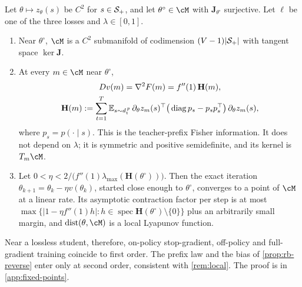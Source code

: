 \begin{proposition}\label{prop:local-conv}
\Ck Let $\theta\mapsto z_\theta(s)$ be $C^2$ for $s\in\mathcal{S}_+$, and let $\theta^\circ\in\cM$ with $\mathbf J_{\theta^\circ}$ surjective. Let $\ell$ be one of the
three losses and $\lambda\in[0,1]$.
\begin{enumerate}[label=(\roman*),nosep]
\item Near $\theta^\circ$, $\cM$ is a $C^2$ submanifold of codimension $(V-1)|\mathcal{S}_+|$ with tangent space $\ker\mathbf J$.
\item At every $m\in\cM$ near $\theta^\circ$,
\begin{gather*}
Dv(m)=\nabla^2F(m)=f''(1)\,\mathbf H(m),\\
\mathbf H(m):=\sum_{t=1}^T\mathbb{E}_{s\sim d^{\,p}_{t}}\,\partial_\theta z_m(s)^\top\big(\operatorname{diag} p_s-p_sp_s^\top\big)\,\partial_\theta z_m(s),
\end{gather*}
where $p_s=p(\cdot\mid s)$. This is the teacher-prefix Fisher information. It does not depend on $\lambda$; it is symmetric and positive
semidefinite, and its kernel is $T_m\cM$.
\item Let $0<\eta<2/\big(f''(1)\lambda_{\max}(\mathbf H(\theta^\circ))\big)$. Then the exact iteration $\theta_{k+1}=\theta_k-\eta v(\theta_k)$, started close enough to $\theta^\circ$,
converges to a point of $\cM$ at a linear rate. Its asymptotic contraction factor per step is at most
$\max\{|1-\eta f''(1)h|:h\in\operatorname{spec}\mathbf H(\theta^\circ)\setminus\{0\}\}$ plus an arbitrarily small margin, and $\operatorname{dist}(\theta,\cM)$ is a
local Lyapunov function.
\end{enumerate}
\end{proposition}
\noindent
Near a lossless student, therefore, on-policy stop-gradient, off-policy and full-gradient training coincide to first
order. The prefix law and the bias of \cref{prop:rb-reverse} enter only at second order, consistent with
\cref{rem:local}. The proof is in \cref{app:fixed-points}.

